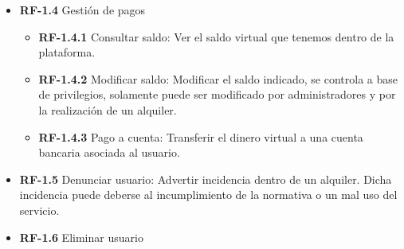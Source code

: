 \documentclass[11pt,spanish]{article} %
\begin{document}
\begin{itemize}
\begin{itemize}
\begin{itemize}
		\end{itemize}
		\item \textbf{RF-1.4} Gestión de pagos
		\begin{itemize}
			\item \textbf{RF-1.4.1} Consultar saldo: Ver el saldo virtual que tenemos dentro de la plataforma.
			\item \textbf{RF-1.4.2} Modificar saldo: Modificar el saldo indicado, se controla a base de privilegios, solamente puede ser modificado por administradores y por la realización de un alquiler.
			\item \textbf{RF-1.4.3} Pago a cuenta: Transferir el dinero virtual a una cuenta bancaria asociada al usuario.
		\end{itemize}
		\item \textbf{RF-1.5} Denunciar usuario: Advertir incidencia dentro de un alquiler. Dicha incidencia puede deberse al incumplimiento de la normativa o un mal uso del servicio.
		\item \textbf{RF-1.6} Eliminar usuario
	\end{itemize}


\end{itemize}
\end{document}
